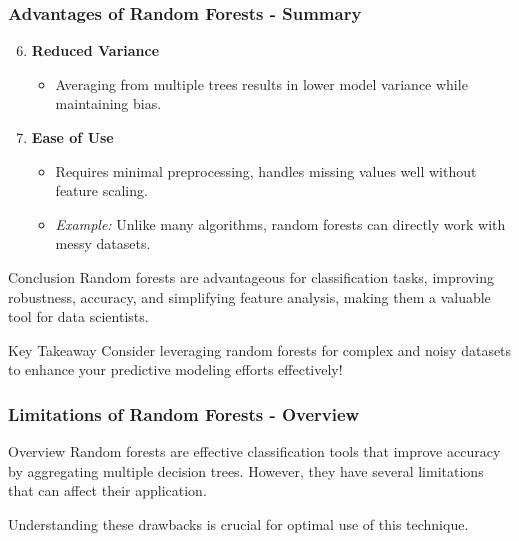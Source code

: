 \documentclass[aspectratio=169]{beamer}
\begin{document}
\begin{frame}[fragile]
    \frametitle{Advantages of Random Forests - Summary}
    \begin{enumerate}
        \setcounter{enumi}{5}
        \item \textbf{Reduced Variance}
        \begin{itemize}
            \item Averaging from multiple trees results in lower model variance while maintaining bias.
        \end{itemize}

        \item \textbf{Ease of Use}
        \begin{itemize}
            \item Requires minimal preprocessing, handles missing values well without feature scaling.
            \item \textit{Example:} Unlike many algorithms, random forests can directly work with messy datasets.
        \end{itemize}
    \end{enumerate}

    \begin{block}{Conclusion}
        Random forests are advantageous for classification tasks, improving robustness, accuracy, and simplifying feature analysis, making them a valuable tool for data scientists.
    \end{block}

    \begin{alertblock}{Key Takeaway}
        Consider leveraging random forests for complex and noisy datasets to enhance your predictive modeling efforts effectively!
    \end{alertblock}
\end{frame}

\begin{frame}[fragile]
    \frametitle{Limitations of Random Forests - Overview}
    \begin{block}{Overview}
        Random forests are effective classification tools that improve accuracy by aggregating multiple decision trees. However, they have several limitations that can affect their application. 
    \end{block}
    Understanding these drawbacks is crucial for optimal use of this technique.
\end{frame}
\end{document}
